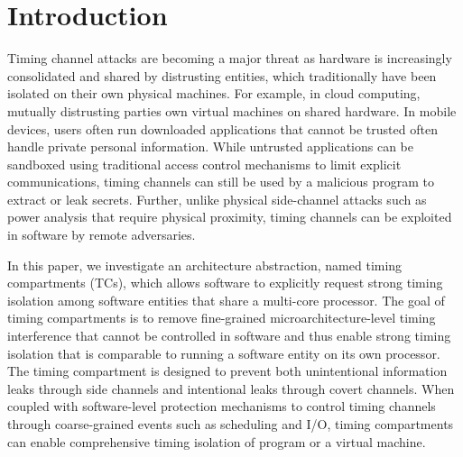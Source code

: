 \section{Introduction}

Timing channel attacks are becoming a major threat as hardware is increasingly 
consolidated and shared by distrusting entities, which traditionally have been
isolated on their own physical machines. For example, in cloud computing, mutually distrusting 
parties own virtual machines on shared hardware. In mobile devices, users often
run downloaded applications that cannot be trusted often handle private personal
information.
While untrusted applications can be sandboxed using
traditional access control mechanisms to limit explicit communications,
timing 
channels can still be used by a malicious program to extract or leak secrets.
Further, unlike physical side-channel attacks such as power analysis that require
physical proximity, timing channels can be exploited in software by remote
adversaries.



In this paper, we investigate an architecture abstraction, named timing compartments (TCs),
which allows software to explicitly request strong timing isolation among software
entities that share a multi-core processor.
The goal of timing compartments is to remove fine-grained microarchitecture-level timing interference
that cannot be controlled in software and thus enable strong timing isolation that is
comparable to running a software entity on its own processor.
The timing compartment is designed to prevent both unintentional information leaks
through side channels and intentional leaks through covert channels.
When coupled with software-level protection mechanisms to control timing channels 
through coarse-grained events such as scheduling and I/O, timing compartments
can enable comprehensive timing isolation of program or a virtual machine.

